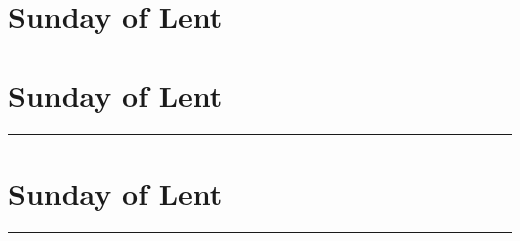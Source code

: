 {{{
\section{ Sunday of Lent}
\printcommonvespers[1]

\bigskip
\benedicamusdomino{}
}

{
\section{ Sunday of Lent}
\printcommonvespers[1]

\def\commemorations{If today is March 18 or 19, the First Vespers of St Joseph is commemorated as follows.}
\printcommemnote{}
}

\medskip
\hrule
{
\label{stjoseph-commem}
\def\begincollectcols{\begin{parcolumns}[rulebetween,colwidths={1=0.42\linewidth}]{2}}
\def\vrlinebreak{T}

\bigskip
\benedicamusdomino{}
}

{
\section{ Sunday of Lent}
\printcommonvespers[1]

\def\commemorations{If today is March 18 or 19, the First Vespers of St Joseph is commemorated as on page \pageref{stjoseph-commem}.  If today is March 25 or 26, the First Vespers of the Annunciation is commemorated as follows.}
\printcommemnote{}
}

\medskip
\hrule
{
\label{annunciation-commem}

\bigskip
\benedicamusdomino{}
}

\def\commemorations{If today is March 18 or 19, the First Vespers of St Joseph is commemorated as on page \pageref{stjoseph-commem}.  If today is March 25 or 26, the First Vespers of the Annunciation is commemorated as on page \pageref{annunciation-commem}.}
{
}}}
